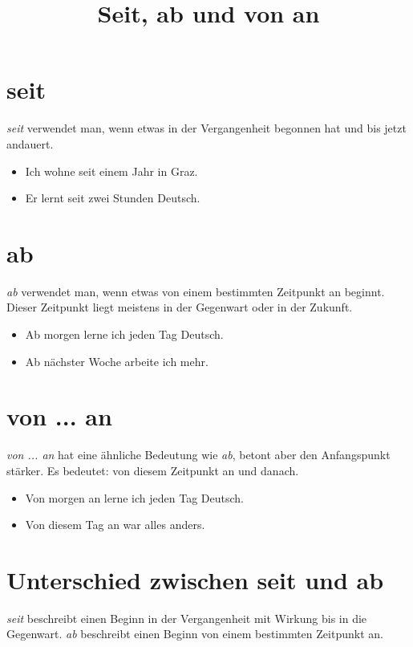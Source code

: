 \documentclass[a4paper]{article}
\title{Seit, ab und von an}
\date{}
\begin{document}
    \maketitle
    
    
    \section{seit}
        \textit{seit} verwendet man, wenn etwas in der Vergangenheit begonnen hat und bis jetzt andauert.
        
        \begin{itemize}
            \item Ich wohne seit einem Jahr in Graz.
            \item Er lernt seit zwei Stunden Deutsch.
        \end{itemize}
    
    
    \section{ab}
        \textit{ab} verwendet man, wenn etwas von einem bestimmten Zeitpunkt an beginnt. Dieser Zeitpunkt liegt meistens in der Gegenwart oder in der Zukunft.
        
        \begin{itemize}
            \item Ab morgen lerne ich jeden Tag Deutsch.
            \item Ab nächster Woche arbeite ich mehr.
        \end{itemize}
    
    
    \section{von ... an}
        \textit{von ... an} hat eine ähnliche Bedeutung wie \textit{ab}, betont aber den Anfangspunkt stärker. Es bedeutet: von diesem Zeitpunkt an und danach.
        
        \begin{itemize}
            \item Von morgen an lerne ich jeden Tag Deutsch.
            \item Von diesem Tag an war alles anders.
        \end{itemize}
    
    
    \section{Unterschied zwischen seit und ab}
        \textit{seit} beschreibt einen Beginn in der Vergangenheit mit Wirkung bis in die Gegenwart.
        \textit{ab} beschreibt einen Beginn von einem bestimmten Zeitpunkt an.
        
\end{document}

